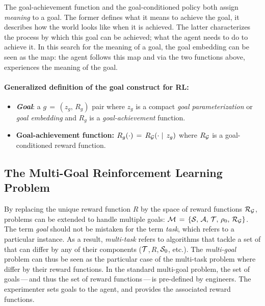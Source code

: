 The goal-achievement function and the goal-conditioned policy both assign \textit{meaning} to a goal. The former defines what it means to achieve the goal, it describes how the world looks like when it is achieved. The latter characterizes the process by which this goal can be achieved; what the agent needs to do to achieve it. In this search for the meaning of a goal, the goal embedding can be seen as the map: the agent follows this map and via the two functions above, experiences the meaning of the goal.


\begin{tcolorbox}
\small
\paragraph{Generalized definition of the goal construct for RL:}
\begin{itemize}
    \item \textbf{\textit{Goal}}: a $g\,=\,(z_g,\,R_g)$ pair where $z_g$ is a compact \textit{goal parameterization} or \textit{goal embedding} and $R_g$ is a \textit{goal-achievement} function.
    \item \textbf{Goal-achievement function: $R_g(\cdot)\,=\,R_{\mathcal{G}}(\cdot\mid\,z_g)$} where $R_{\mathcal{G}}$ is a goal-conditioned reward function.
\end{itemize}
\end{tcolorbox}


\subsection{The Multi-Goal Reinforcement Learning Problem}
By replacing the unique reward function $R$ by the space of reward functions $\mathcal{R}_{\mathcal{G}}$, \rl problems can be extended to handle multiple goals: $\mathcal{M}\,=\,\{\mathcal{S},\,\mathcal{A},\,\mathcal{T},\,\rho_0,\,\mathcal{R}_{\mathcal{G}}\}$. The term \textit{goal} should not be mistaken for the term \textit{task}, which refers to a particular \mdp instance. As a result, \textit{multi-task} \rl refers to \rl algorithms that tackle a set of \mdps that can differ by any of their components (\eg $\mathcal{T}$,\,$R$,\,$\mathcal{S}_0$, etc.). The \textit{multi-goal} \rl problem can thus be seen as the particular case of the multi-task \rl problem where \mdps differ by their reward functions. In the standard multi-goal \rl problem, the set of goals\,---\,and thus the set of reward functions\,---\,is pre-defined by engineers. The experimenter sets goals to the agent, and provides the associated reward functions. 

